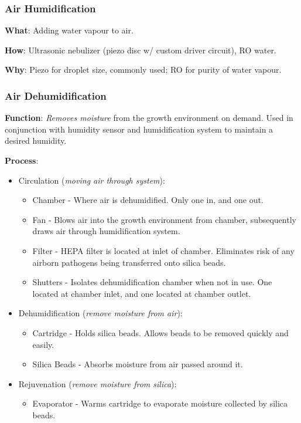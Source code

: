 \documentclass{report}
\begin{document}
\newpage


\subsubsection{Air Humidification}
\label{sec:airhum}

\textbf{What}: Adding water vapour to air.

\textbf{How}: Ultrasonic nebulizer (piezo disc w/ custom driver circuit), RO water.

\textbf{Why}: Piezo for droplet size, commonly used; RO for purity of water vapour.

\subsubsection{Air Dehumidification}
\label{sec:dehum}

\textbf{Function}: \textit{Removes moisture} from the growth environment on demand. Used in conjunction with humidity sensor and humidification system to maintain a desired humidity.

\textbf{Process}:
\begin{itemize}
    \item Circulation (\textit{moving air through system}):
    \begin{itemize}
        \item Chamber - Where air is dehumidified. Only one in, and one out.
        \item Fan - Blows air into the growth environment from chamber, subsequently draws air through humidification system.
        \item Filter - HEPA filter is located at inlet of chamber. Eliminates risk of any airborn pathogens being transferred onto silica beads.
        \item Shutters - Isolates dehumidification chamber when not in use. One located at chamber inlet, and one located at chamber outlet. 
    \end{itemize}
    \item Dehumidification (\textit{remove moisture from air}):
    \begin{itemize}
        \item Cartridge - Holds silica beads. Allows beads to be removed quickly and easily.
        \item Silica Beads - Absorbs moisture from air passed around it.
    \end{itemize}
    \item Rejuvenation (\textit{remove moisture from silica}):
    \begin{itemize}
        \item Evaporator - Warms cartridge to evaporate moisture collected by silica beads.
    \end{itemize}
\end{itemize}
\end{document}
